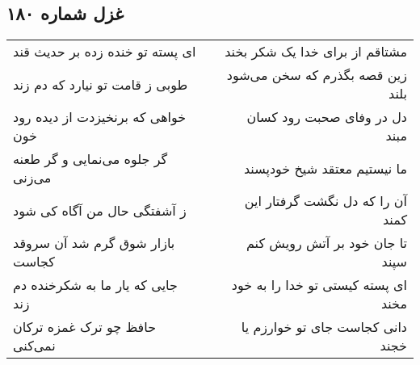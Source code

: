 \begin{center}
\section*{غزل شماره ۱۸۰}
\label{sec:sh180}
\begin{longtable}{l p{0.5cm} r}
ای پسته تو خنده زده بر حدیث قند
&&
مشتاقم از برای خدا یک شکر بخند
\\
طوبی ز قامت تو نیارد که دم زند
&&
زین قصه بگذرم که سخن می‌شود بلند
\\
خواهی که برنخیزدت از دیده رود خون
&&
دل در وفای صحبت رود کسان مبند
\\
گر جلوه می‌نمایی و گر طعنه می‌زنی
&&
ما نیستیم معتقد شیخ خودپسند
\\
ز آشفتگی حال من آگاه کی شود
&&
آن را که دل نگشت گرفتار این کمند
\\
بازار شوق گرم شد آن سروقد کجاست
&&
تا جان خود بر آتش رویش کنم سپند
\\
جایی که یار ما به شکرخنده دم زند
&&
ای پسته کیستی تو خدا را به خود مخند
\\
حافظ چو ترک غمزه ترکان نمی‌کنی
&&
دانی کجاست جای تو خوارزم یا خجند
\\
\end{longtable}
\end{center}

